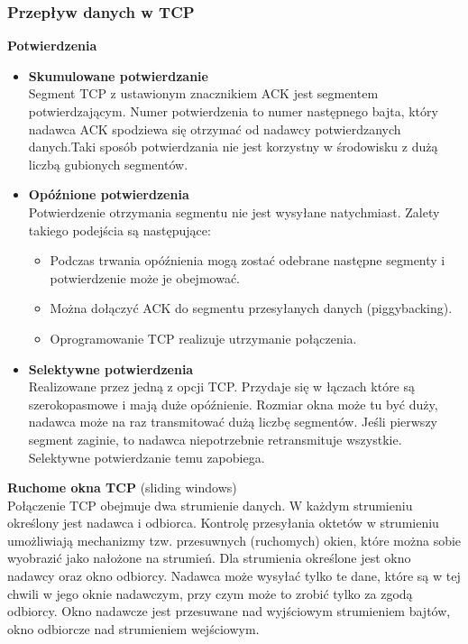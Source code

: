 \documentclass[../main.tex]{subfiles}
\begin{document}
    \subsubsection{Przepływ danych w TCP}
    \textbf{Potwierdzenia}
    \begin{itemize}
        \item \textbf{Skumulowane potwierdzanie}\\
        Segment TCP z ustawionym znacznikiem ACK jest segmentem potwierdzającym. Numer
        potwierdzenia to numer następnego bajta, który nadawca ACK spodziewa się otrzymać od nadawcy potwierdzanych danych.Taki sposób potwierdzania nie jest korzystny w
        środowisku z dużą liczbą gubionych segmentów.
        \item \textbf{Opóźnione potwierdzenia}\\
        Potwierdzenie otrzymania segmentu nie jest wysyłane natychmiast. Zalety takiego podejścia
        są następujące:
        \begin{itemize}
            \item Podczas trwania opóźnienia mogą zostać odebrane następne segmenty i potwierdzenie może je obejmować.
            \item Można dołączyć ACK do segmentu przesyłanych danych (piggybacking).
            \item Oprogramowanie TCP realizuje utrzymanie połączenia.
        \end{itemize}
        \item \textbf{Selektywne potwierdzenia}\\
        Realizowane przez jedną z opcji TCP. Przydaje się w łączach które są szerokopasmowe i mają duże opóźnienie. Rozmiar okna może tu być duży, nadawca może na raz transmitować dużą liczbę segmentów. Jeśli pierwszy segment zaginie, to nadawca niepotrzebnie retransmituje wszystkie. Selektywne potwierdzanie temu zapobiega.
    \end{itemize}

    \textbf{Ruchome okna TCP} (sliding windows)\\
    Połączenie TCP obejmuje dwa strumienie danych. W każdym strumieniu określony jest
    nadawca i odbiorca. Kontrolę przesyłania oktetów w strumieniu umożliwiają mechanizmy
    tzw. przesuwnych (ruchomych) okien, które można sobie wyobrazić jako nałożone na
    strumień. Dla strumienia określone jest okno nadawcy oraz okno odbiorcy. Nadawca może
    wysyłać tylko te dane, które są w tej chwili w jego oknie nadawczym, przy czym może to
    zrobić tylko za zgodą odbiorcy. Okno nadawcze jest przesuwane nad wyjściowym
    strumieniem bajtów, okno odbiorcze nad strumieniem wejściowym.
\end{document}
